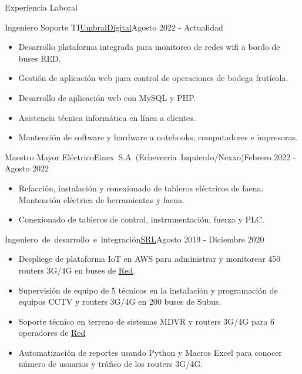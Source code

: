 \documentclass[]{mcdowellcv}
\begin{document}
	\makeheader
	
	\begin{cvsection}{Experiencia Laboral}
		\begin{cvsubsection}{Ingeniero Soporte TI}{\mbox{\href{https://umbraldigital.cl/}{UmbralDigital}}}{Agosto 2022 - Actualidad}		
			\begin{itemize}
				\item Desarrollo plataforma integrada para monitoreo de redes wifi a bordo de buses RED.
				\item Gestión de aplicación web para control de operaciones de bodega frutícola.
				\item Desarrollo de aplicación web con MySQL y PHP.
				\item Asistencia técnica informática en línea a clientes.
				\item Mantención de software y hardware a notebooks, computadores e impresoras.
			\end{itemize}
		\end{cvsubsection}
		\begin{cvsubsection}{Maestro Mayor Eléctrico}{\mbox{Einex S.A (Echeverria Izquierdo/Nexxo)}}{Febrero 2022 - Agosto 2022}		
			\begin{itemize}
				\item Refacción, instalación y conexionado de tableros eléctricos de faena. Mantención eléctrica de herramientas y faena.
				\item Conexionado de tableros de control, instrumentación, fuerza y PLC.
			\end{itemize}
		\end{cvsubsection}
		
		\begin{cvsubsection}{\mbox{Ingeniero de desarrollo e integración}}{\href{https://www.srl.cl/empresa/}{SRL}}{Agosto 2019 - Diciembre 2020}	
			\begin{itemize}
				\item Despliege de plataforma IoT en AWS para administrar y monitorear 450 routers 3G/4G en buses de \href{https://www.red.cl/}{Red}. 
				\item Supervisión de equipo de 5 técnicos en la instalación y programación de equipos CCTV y routers 3G/4G en 200 buses de Subus.
				\item Soporte técnico en terreno de sistemas MDVR y routers 3G/4G para 6 operadores de \href{https://www.red.cl/}{Red}
				\item Automatización de reportes usando Python y Macros Excel para conocer número de usuarios y tráfico de los routers 3G/4G.
			\end{itemize}
		\end{cvsubsection}
		

\end{cvsection}
\end{document}
